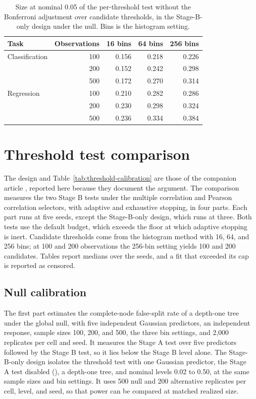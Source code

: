 \documentclass[11pt]{article}
\newcommand{\code}[1]{\texttt{\detokenize{#1}}}
\begin{document}
\begin{table}[t!]
\centering
\small
\begin{tabular}{lrrrr}
\toprule
Task & Observations & 16 bins & 64 bins & 256 bins \\ \midrule
Classification & 100 & 0.156 & 0.218 & 0.226 \\
 & 200 & 0.152 & 0.242 & 0.298 \\
 & 500 & 0.172 & 0.270 & 0.314 \\
Regression & 100 & 0.210 & 0.282 & 0.286 \\
 & 200 & 0.230 & 0.298 & 0.324 \\
 & 500 & 0.236 & 0.334 & 0.384 \\
\bottomrule
\end{tabular}
\caption{Size at nominal 0.05 of the per-threshold test without the
Bonferroni adjustment over candidate thresholds, in the Stage-B-only design
under the null. Bins is the histogram setting.}
\label{tab:noadjust}
\end{table}

\section{Threshold test comparison} \label{sec:threshold-design}

The design and Table~\ref{tab:threshold-calibration} are those of the
companion article \citep{Milletich+Downes+Goley+Hirst:2026}, reported here
because they document the \code{threshold_test} argument. The comparison
measures the two Stage B tests under the multiple correlation and Pearson
correlation selectors, with adaptive and exhaustive stopping, in four parts.
Each part runs at five seeds, except the Stage-B-only design, which runs at
three. Both tests use the default \code{"auto"} budget, which exceeds the
floor at which adaptive stopping is inert. Candidate thresholds come from the
histogram method with 16, 64, and 256 bins; at 100 and 200 observations the
256-bin setting yields 100 and 200 candidates. Tables report medians over the
seeds, and a fit that exceeded its cap is reported as censored.

\subsection{Null calibration}

The first part estimates the complete-node false-split rate of a depth-one
tree under the global null, with five independent Gaussian predictors, an
independent response, sample sizes 100, 200, and 500, the three bin settings,
and 2,000 replicates per cell and seed. It measures the Stage A test over
five predictors followed by the Stage B test, so it lies below the Stage B
level alone. The Stage-B-only design isolates the threshold test with one
Gaussian predictor, the Stage A test disabled (\code{alpha_selector = 1}), a
depth-one tree, and nominal levels 0.02 to 0.50, at the same sample sizes and
bin settings. It uses 500 null and 200 alternative replicates per cell,
level, and seed, so that power can be compared at matched realized size.
\end{document}

